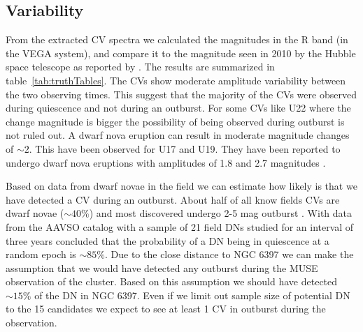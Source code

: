 \subsection{Variability}

From the extracted CV spectra we calculated the magnitudes in the R band (in the VEGA system), and compare it to the magnitude seen in 2010 by the Hubble space telescope as reported by \cite{cohn_identification_2010}. The results are summarized in table~\ref{tab:truthTables}. The CVs show moderate amplitude variability between the two observing times. This suggest that the majority of the CVs were observed during quiescence and not during an outburst. For some CVs like U22 where the change magnitude is bigger the possibility of being observed during outburst is not ruled out. A dwarf nova eruption can result in moderate magnitude changes of $\sim 2$. This have been observed for U17 and U19. They have been reported to undergo dwarf nova eruptions with amplitudes of 1.8 and 2.7 magnitudes \citep{shara_erupting_2005}. 

Based on data from dwarf novae in the field we can estimate how likely is that we have detected a CV during an outburst. About half of all know fields CVs are dwarf novae ($\sim 40 \%$) and most discovered undergo 2-5 mag outburst \citep{2001PASP..113..764D,warner_cataclysmic_2003}. With data from the AAVSO catalog with a sample of 21 field DNs studied for an interval of three years \cite{Szkody_21DN_1984} concluded that the probability of a DN being in quiescence at a random epoch is $\sim 85 \%$. Due to the close distance to NGC 6397 we can make the assumption that we would have detected any outburst during the MUSE observation of the cluster. Based on this assumption we should have detected $\sim 15 \%$ of the DN in NGC 6397. Even if we limit out sample size of potential DN to the 15 candidates we expect to see at least 1 CV in outburst during the observation.  


